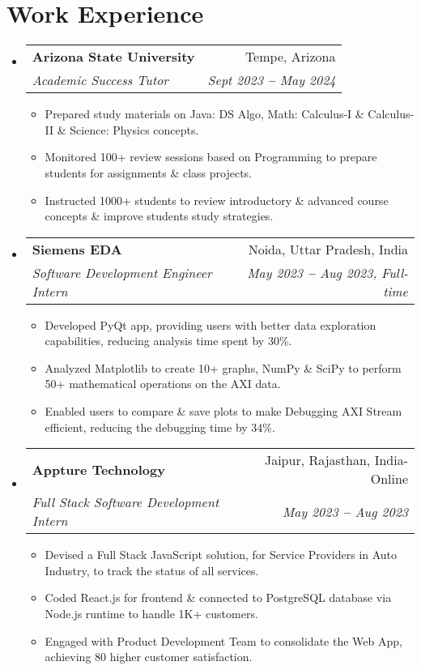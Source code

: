 \documentclass[letterpaper,11pt]{article}
\makeatletter
\newcommand{\resumeItem}[1]{
  \item\small{
    {#1 \vspace{-2pt}}
  }
}
\newcommand{\resumeSubheading}[4]{
  \vspace{-2pt}\item
    \begin{tabular*}{0.97\textwidth}[t]{l@{\extracolsep{\fill}}r}
      \textbf{#1} & #2 \\
      \textit{\small#3} & \textit{\small #4} \\
    \end{tabular*}\vspace{-7pt}
}
\newcommand{\resumeSubHeadingListStart}{\begin{itemize}[leftmargin=0.15in, label={}]}
\newcommand{\resumeSubHeadingListEnd}{\end{itemize}}
\newcommand{\resumeItemListStart}{\begin{itemize}[leftmargin=0.2in]}
\newcommand{\resumeItemListEnd}{\end{itemize}\vspace{-5pt}}
\makeatother
\begin{document}

\section{Work Experience}
  \resumeSubHeadingListStart

    \resumeSubheading
      {Arizona State University}{Tempe, Arizona}
      {Academic Success Tutor}{Sept 2023 \textbf{--} May 2024}
        \resumeItemListStart
          \resumeItem{Prepared study materials on Java: DS Algo, Math: Calculus-I \& Calculus-II \& Science: Physics concepts.}
          \resumeItem{Monitored 100+ review sessions based on Programming to prepare students for assignments \& class projects.}
          \resumeItem{Instructed 1000+ students to review introductory \& advanced course concepts \& improve students study strategies.}
        \resumeItemListEnd

    \resumeSubheading
      {Siemens EDA}{Noida, Uttar Pradesh, India}
      {Software Development Engineer Intern}{May 2023 \textbf{--} Aug 2023, Full-time}
        \resumeItemListStart
          \resumeItem{Developed PyQt app, providing users with better data exploration capabilities, reducing analysis time spent by 30\%.}
          \resumeItem{Analyzed Matplotlib to create 10+ graphs, NumPy \& SciPy to perform 50+ mathematical operations on the AXI data.}
          \resumeItem{Enabled users to compare \& save plots to make Debugging AXI Stream efficient, reducing the debugging time by 34\%.}
        \resumeItemListEnd

    \resumeSubheading
      {Appture Technology}{Jaipur, Rajasthan, India- Online}
      {Full Stack Software Development Intern}{May 2023 \textbf{--} Aug 2023}
        \resumeItemListStart
            \resumeItem{Devised a Full Stack JavaScript solution, for Service Providers in Auto Industry, to track the status of all services.}
            \resumeItem{Coded React.js for frontend \& connected to PostgreSQL database via Node.js runtime to handle 1K+ customers.}
            \resumeItem{Engaged with Product Development Team to consolidate the Web App, achieving 80 higher customer satisfaction.}
        \resumeItemListEnd
  \resumeSubHeadingListEnd
\end{document}
